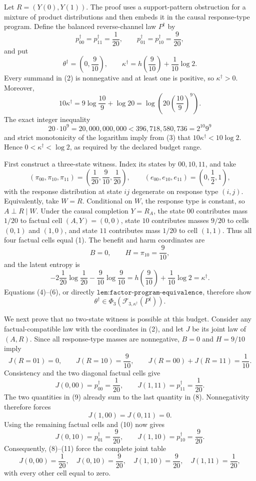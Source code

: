 Let \(R=(Y(0),Y(1))\). The proof uses a support-pattern obstruction for a mixture of product distributions and then embeds it in the causal response-type program. Define the balanced reverse-channel law \(P^\dagger\) by
\[
p^\dagger_{00}=p^\dagger_{11}=\frac1{20},
\qquad
p^\dagger_{01}=p^\dagger_{10}=\frac9{20},
\tag{1}
\]
and put
\[
\theta^\dagger=\left(0,\frac9{10}\right),
\qquad
\kappa^\dagger=h\!\left(\frac9{10}\right)+\frac1{10}\log2.
\tag{2}
\]
Every summand in (2) is nonnegative and at least one is positive, so \(\kappa^\dagger>0\). Moreover,
\[
10\kappa^\dagger
=9\log\frac{10}{9}+\log20
=\log\!\left(20\left(\frac{10}{9}\right)^9\right).
\tag{3}
\]
The exact integer inequality
\[
20\cdot10^9=20{,}000{,}000{,}000
<396{,}718{,}580{,}736=2^{10}9^9
\]
and strict monotonicity of the logarithm imply from (3) that \(10\kappa^\dagger<10\log2\). Hence \(0<\kappa^\dagger<\log2\), as required by the declared budget range.

First construct a three-state witness. Index its states by \(00,10,11\), and take
\[
(\pi_{00},\pi_{10},\pi_{11})
=\left(\frac1{20},\frac9{10},\frac1{20}\right),
\qquad
(e_{00},e_{10},e_{11})=\left(0,\frac12,1\right),
\tag{4}
\]
with the response distribution at state \(ij\) degenerate on response type \((i,j)\). Equivalently, take \(W=R\). Conditional on \(W\), the response type is constant, so \(A\perp R\mid W\). Under the causal completion \(Y=R_A\), the state \(00\) contributes mass \(1/20\) to factual cell \((A,Y)=(0,0)\), state \(10\) contributes masses \(9/20\) to cells \((0,1)\) and \((1,0)\), and state \(11\) contributes mass \(1/20\) to cell \((1,1)\). Thus all four factual cells equal (1). The benefit and harm coordinates are
\[
B=0,
\qquad
H=\pi_{10}=\frac9{10},
\tag{5}
\]
and the latent entropy is
\[
-2\frac1{20}\log\frac1{20}
-\frac9{10}\log\frac9{10}
=h\!\left(\frac9{10}\right)+\frac1{10}\log2
=\kappa^\dagger.
\tag{6}
\]
Equations (4)--(6), or directly \(\texttt{lem:factor-program-equivalence}\), therefore show
\[
\theta^\dagger\in
\Phi_3(\mathcal F_{3,\kappa^\dagger}(P^\dagger)).
\tag{7}
\]

We next prove that no two-state witness is possible at this budget. Consider any factual-compatible law with the coordinates in (2), and let \(J\) be its joint law of \((A,R)\). Since all response-type masses are nonnegative, \(B=0\) and \(H=9/10\) imply
\[
J(R=01)=0,
\qquad J(R=10)=\frac9{10},
\qquad J(R=00)+J(R=11)=\frac1{10}.
\tag{8}
\]
Consistency and the two diagonal factual cells give
\[
J(0,00)=p^\dagger_{00}=\frac1{20},
\qquad
J(1,11)=p^\dagger_{11}=\frac1{20}.
\tag{9}
\]
The two quantities in (9) already sum to the last quantity in (8). Nonnegativity therefore forces
\[
J(1,00)=J(0,11)=0.
\tag{10}
\]
Using the remaining factual cells and (10) now gives
\[
J(0,10)=p^\dagger_{01}=\frac9{20},
\qquad
J(1,10)=p^\dagger_{10}=\frac9{20}.
\tag{11}
\]
Consequently, (8)--(11) force the complete joint table
\[
J(0,00)=\frac1{20},\quad
J(0,10)=\frac9{20},\quad
J(1,10)=\frac9{20},\quad
J(1,11)=\frac1{20},
\tag{12}
\]
with every other cell equal to zero.

